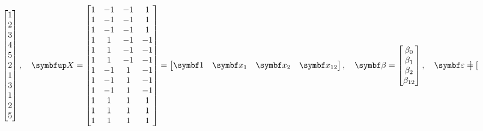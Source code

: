 \begin{itemize}
\begin{itemize}
\[\begin{bmatrix}
                            1 \\
                            2 \\
                            3 \\
                            4 \\
                            5 \\
                            2 \\
                            1 \\
                            3 \\
                            1 \\
                            2 \\
                            5
                        \end{bmatrix},\quad\Matrix{X}=\begin{bmatrix}
                            1 & -1 & -1 & 1  \\
                            1 & -1 & -1 & 1  \\
                            1 & -1 & -1 & 1  \\
                            1 & 1  & -1 & -1 \\
                            1 & 1  & -1 & -1 \\
                            1 & 1  & -1 & -1 \\
                            1 & -1 & 1  & -1 \\
                            1 & -1 & 1  & -1 \\
                            1 & -1 & 1  & -1 \\
                            1 & 1  & 1  & 1  \\
                            1 & 1  & 1  & 1  \\
                            1 & 1  & 1  & 1
                        \end{bmatrix}=\begin{bmatrix}
                            \Vector{1} & \Vector{x}_1 & \Vector{x}_2 & \Vector{x}_{12}
                        \end{bmatrix},\quad\Vector{\beta}=\begin{bmatrix}
                            \beta_0 \\
                            \beta_1 \\
                            \beta_2 \\
                            \beta_{12}
                        \end{bmatrix},\quad\RandomVector{\varepsilon}=\begin{bmatrix}

\end{bmatrix}\]
\end{itemize}
\end{itemize}
